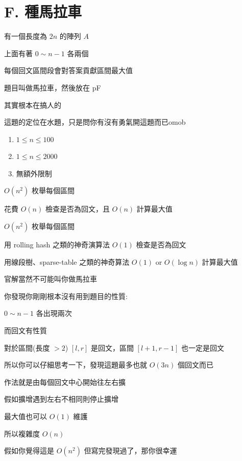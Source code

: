 \section{F. 種馬拉車}

\begin{frame}{}
    有一個長度為 $2n$ 的陣列 $A$

    上面有著 $0 \sim n-1$ 各兩個

    每個回文區間段會對答案貢獻區間最大值
\end{frame}

\begin{frame}{}
    題目叫做馬拉車，然後放在 pF

    其實根本在搞人的

    這題的定位在水題，只是問你有沒有勇氣開這題而已omob
\end{frame}

\begin{frame}{}
    \begin{enumerate}
        \item{$1 \le n \le 100$}
        \item{$1 \le n \le 2000$}
        \item{無額外限制}
    \end{enumerate}
\end{frame}

\begin{frame}{}
    $O(n^2)$ 枚舉每個區間

    花費 $O(n)$ 檢查是否為回文，且 $O(n)$ 計算最大值
\end{frame}

\begin{frame}{}
    $O(n^2)$ 枚舉每個區間

    用 rolling hash 之類的神奇演算法 $O(1)$ 檢查是否為回文

    用線段樹、sparse-table 之類的神奇算法 $O(1)$ or $O(\log n)$ 計算最大值
\end{frame}

\begin{frame}{}
    官解當然不可能叫你做馬拉車

    你發現你剛剛根本沒有用到題目的性質:

    \begin{property}
        $0 \sim n-1$ 各出現兩次
    \end{property}

    而回文有性質

    \begin{property}
        對於區間(長度 $>2$) $[l, r]$ 是回文，區間 $[l+1, r-1]$ 也一定是回文
    \end{property}

    所以你可以仔細思考一下，發現這題最多也就 $O(3 n)$ 個回文而已
\end{frame}

\begin{frame}{}
    作法就是由每個回文中心開始往左右擴

    假如擴增遇到左右不相同則停止擴增

    最大值也可以 $O(1)$ 維護

    所以複雜度 $O(n)$
    \pause

    假如你覺得這是 $O(n^2)$ 但寫完發現過了，那你很幸運
\end{frame}
